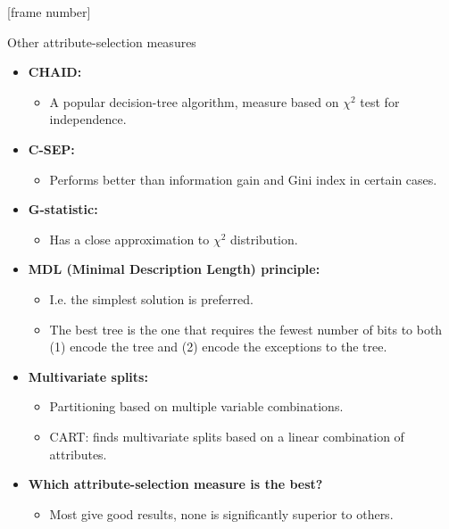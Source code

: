 \documentclass[aspectratio=169,t,table]{beamer}
\begin{document}
  {
    [frame number]
    \begin{frame}{Other attribute-selection measures}
      \begin{itemize}
        \item \textbf{CHAID:}
        \begin{itemize}
          \item A popular decision-tree algorithm, measure based on $\chi^2$ test for independence.
        \end{itemize}
        \item \textbf{C-SEP:}
        \begin{itemize}
          \item Performs better than information gain and Gini index in certain cases.
        \end{itemize}
        \item \textbf{G-statistic:}
        \begin{itemize}
          \item Has a close approximation to $\chi^2$ distribution.
        \end{itemize}
        \item \textbf{MDL (Minimal Description Length) principle:}
        \begin{itemize}
          \item I.e. the simplest solution is preferred.
          \item The best tree is the one that requires the fewest number of bits to both (1) encode the tree and (2) encode the exceptions to the tree.
        \end{itemize}
        \item \textbf{Multivariate splits:}
        \begin{itemize}
          \item Partitioning based on multiple variable combinations.
          \item CART: finds multivariate splits based on a linear combination of attributes.
        \end{itemize}
        \item \textbf{Which attribute-selection measure is the best?}
        \begin{itemize}
          \item Most give good results, none is significantly superior to others.
        \end{itemize}
      \end{itemize}
    \end{frame}
  }
\end{document}
